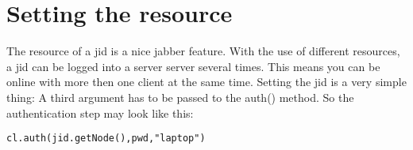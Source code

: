 \section{Setting the resource}

The resource of a jid is a nice jabber feature. With the use of different resources, a jid can be logged into a server server several times. This means you can be online with more then one client 	at the same time.
Setting the jid is a very simple thing: A third argument has to be passed to the auth() method.
So the authentication step may look like this:



\begin{verbatim}
cl.auth(jid.getNode(),pwd,"laptop")
\end{verbatim}

